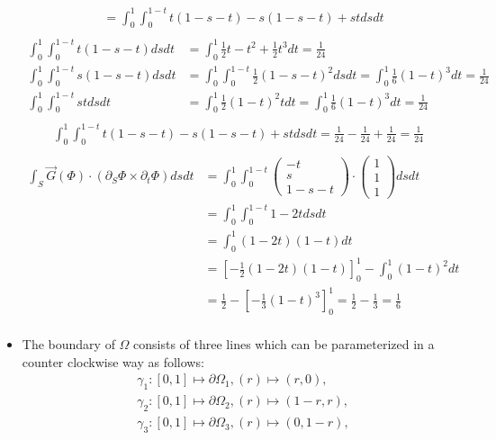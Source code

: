 \documentclass[11pt]{article}
\begin{document}
\begin{solution}
\begin{itemize}
\begin{align*}
        &= \int_0^1 \int_0^{1-t} t(1-s-t)-s(1-s-t)+st ds dt\\
	\end{align*}
	\begin{align*}
        \int_0^1 \int_0^{1-t} t(1-s-t) ds dt &= \int_0^1 \frac{1}{2}t -t^2 + \frac{1}{2}t^3 dt = \frac{1}{24}\\
        \int_0^1 \int_0^{1-t} s(1-s-t) ds dt &=\int_0^1 \int_0^{1-t} \frac{1}{2}(1-s-t)^2 ds dt =\int_0^1 \frac{1}{6}(1-t)^3 dt  =  \frac{1}{24}\\
        \int_0^1 \int_0^{1-t} st ds dt &=\int_0^1 \frac{1}{2}(1-t)^2t dt =\int_0^1 \frac{1}{6}(1-t)^3 dt  =  \frac{1}{24}\\
	\end{align*}
	\begin{align*}
    	\int_0^1 \int_0^{1-t} t(1-s-t)-s(1-s-t)+st ds dt = \frac{1}{24} - \frac{1}{24} + \frac{1}{24} =  \frac{1}{24}\\
	\end{align*}
	\begin{align*}
	    \int_S \vec{G}(\Phi) \cdot  ( \partial_S \Phi \times \partial_t \Phi ) dsdt &= \int_0^1 \int_0^{1-t} \begin{pmatrix}-t\\s\\1-s-t\end{pmatrix}\cdot  \begin{pmatrix}1\\1\\1\end{pmatrix} ds dt\\
        &= \int_0^1 \int_0^{1-t} 1-2t ds dt\\
        &= \int_0^1 (1-2t)(1-t) dt\\
        &= \left[-\frac{1}{2}(1-2t)(1-t)\right]_0^1 -\int_0^1 (1-t)^2 dt \\
        &= \frac{1}{2} -\left[-\frac{1}{3}(1-t)^3\right]_0^1 = \frac{1}{2} - \frac{1}{3} = \frac{1}{6}\\
	\end{align*}
    \item The boundary of $\Omega$ consists of three lines which can be parameterized in a counter clockwise way as follows:
	\begin{align*}
	&\gamma_1 : [0,1]\mapsto \partial \Omega_1, (r) \mapsto (r,0),\\
	&\gamma_2 : [0,1]\mapsto \partial \Omega_2, (r) \mapsto (1-r,r),\\
	&\gamma_3 : [0,1]\mapsto \partial \Omega_3, (r) \mapsto (0,1-r),

\end{align*}
\end{itemize}
\end{solution}
\end{document}
